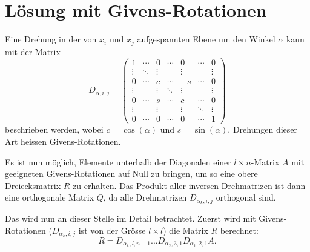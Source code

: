 %
%
%
\section{Lösung mit Givens-Rotationen
\label{qr:section:loesung}}
%
Eine Drehung in der von $x_i$ und $x_j$ aufgespannten Ebene um den Winkel $\alpha$ kann mit der Matrix
\begin{equation}
D_{\alpha,i,j}=
\begin{pmatrix}
1     &\cdots&0     &\cdots&0     &\cdots&0\\
\vdots&\ddots&\vdots&      &\vdots&      &\vdots\\
0     &\cdots&c     &\cdots&-s    &\cdots&0\\
\vdots&      &\vdots&\ddots&\vdots&      &\vdots\\
0     &\cdots&s     &\cdots&c     &\cdots&0\\
\vdots&      &\vdots&      &\vdots&\ddots&\vdots\\
0     &\cdots&0     &\cdots&0     &\cdots&1
\end{pmatrix}
\end{equation}
beschrieben werden, wobei $c=\cos(\alpha)$ und $s=\sin(\alpha)$.
Drehungen dieser Art heissen Givens-Rotationen.

Es ist nun möglich, Elemente unterhalb der Diagonalen einer $l\times n $-Matrix $A$ mit geeigneten Givens-Rotationen auf Null zu bringen, um so eine obere Dreiecksmatrix $R$ zu erhalten.
Das Produkt aller inversen Drehmatrizen ist dann eine orthogonale Matrix $Q$, da alle Drehmatrizen $D_{\alpha_k,i,j}$ orthogonal sind.

Das wird nun an dieser Stelle im Detail betrachtet.
Zuerst wird mit Givens-Rotationen ($D_{\alpha_k, i, j}$ ist von der Grösse $l\times l$) die Matrix $R$ berechnet: 
\begin{equation*}
R = D_{\alpha_k,l,n-1}...D_{\alpha_2,3,1}D_{\alpha_1,2,1}A.		
\end{equation*}


